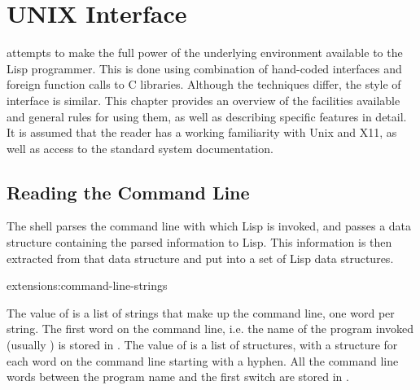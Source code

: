 \chapter{UNIX Interface}
\label{unix-interface}



\cmucl{} attempts to make the full power of the underlying
environment available to the Lisp programmer. This is done using
combination of hand-coded interfaces and foreign function calls to C
libraries. Although the techniques differ, the style of interface is
similar. This chapter provides an overview of the facilities available
and general rules for using them, as well as describing specific
features in detail. It is assumed that the reader has a working
familiarity with Unix and X11, as well as access to the standard
system documentation.


\section{Reading the Command Line}

The shell parses the command line with which Lisp is invoked, and
passes a data structure containing the parsed information to Lisp.
This information is then extracted from that data structure and put
into a set of Lisp data structures.

\begin{defvar}{extensions:}{command-line-strings}
  
  The value of  is a list of strings that
  make up the command line, one word per string.  The first word on
  the command line, i.e.  the name of the program invoked (usually
  ) is stored in .  The
  value of  is a list of
   structures, with a structure for each
  word on the command line starting with a hyphen.  All the command
  line words between the program name and the first switch are stored
  in .
\end{defvar}

